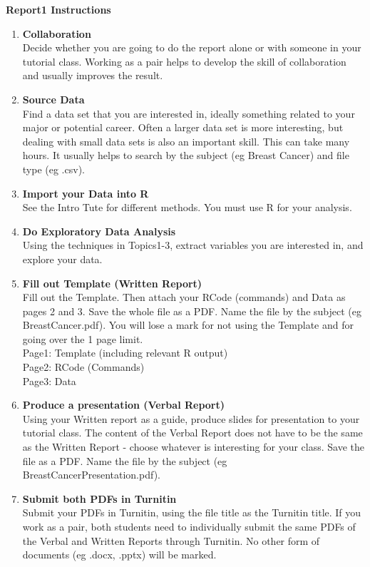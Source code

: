 \documentclass[bigtut]{quiz}\usepackage[]{graphicx}\usepackage[]{color}
\begin{document}
\begin{tutorial}
\newpage
{\bf Report1 Instructions}
\begin{enumerate}
\item {\bf Collaboration} \\
Decide whether you are going to do the report alone or with someone in your tutorial class. Working as a pair helps to develop the skill of collaboration and usually improves the result. \\
\item {\bf Source Data} \\
Find a data set that you are interested in, ideally something related to your major or potential career.   Often a larger data set is more interesting, but dealing with small data sets is also an important skill. This can take many hours. It usually helps to search by the subject (eg Breast Cancer) and file type (eg .csv). \\
\item {\bf Import your Data into R} \\
See the Intro Tute for different methods. You must use R for your analysis. \\
\item {\bf Do Exploratory Data Analysis} \\
Using the techniques in Topics1-3, extract variables you are interested in, and explore your data. \\
\item {\bf Fill out Template (Written Report)} \\
Fill out the Template. Then attach your RCode (commands) and Data as pages 2 and 3. Save the whole file as a PDF. Name the file by the subject (eg BreastCancer.pdf). You will lose a mark for not using the Template and for going over the 1 page limit. \\

\noindent
Page1: Template (including relevant R output) \\
Page2: RCode (Commands) \\
Page3: Data \\

\item {\bf Produce a presentation (Verbal Report)} \\
Using your Written report as a guide, produce slides for presentation to your tutorial class. The content of the Verbal Report does not have to be the same as the Written Report - choose whatever is interesting for your class. Save the file as a PDF. Name the file by the subject (eg BreastCancerPresentation.pdf). \\
\item {\bf Submit both PDFs in Turnitin} \\
Submit your PDFs in Turnitin, using the file title as the Turnitin title. If you work as a pair, both students need to individually submit the same PDFs of the Verbal and Written Reports through Turnitin. No other form of documents (eg .docx, .pptx) will be marked. \\


\end{enumerate}
\end{tutorial}
\end{document}
